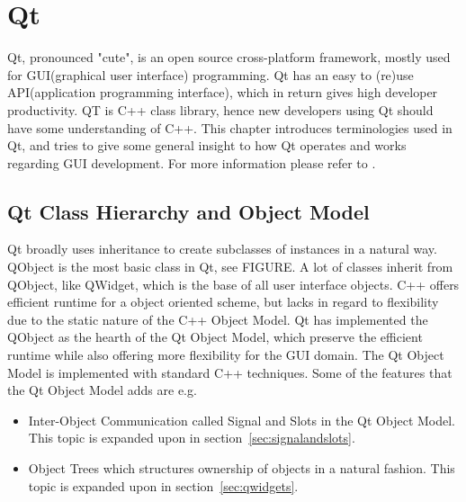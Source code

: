 \section{Qt}
Qt, pronounced "cute", is an open source cross-platform framework, mostly used for GUI(graphical user interface) programming. Qt has an easy to (re)use API(application programming interface), which in return gives high developer productivity. QT is C++ class library, hence new developers using Qt should have some understanding of C++.
This chapter introduces terminologies used in Qt, and tries to give some general insight to how Qt operates and works regarding GUI development. For more information please refer to \citep{Qt Documentation}.




\subsection{Qt Class Hierarchy and Object Model}
\label{sec:QtClassHierarchyAndObjectModel}
Qt broadly uses inheritance to create subclasses of instances in a natural way. QObject is the most basic class in Qt, see FIGURE. A lot of classes inherit from QObject, like QWidget, which is the base of all user interface objects. 
C++ offers efficient runtime for a object oriented scheme, but lacks in regard to flexibility due to the static nature of the C++ Object Model. Qt has implemented the QObject as the hearth of the Qt Object Model, which preserve the efficient runtime while also offering more flexibility for the GUI domain. The Qt Object Model is implemented with standard C++ techniques. Some of the features that the Qt Object Model adds are e.g.

\begin{itemize}
\item Inter-Object Communication called Signal and Slots in the Qt Object Model. This topic is expanded upon in section~\ref{sec:signalandslots}.
\item Object Trees which structures ownership of objects in a natural fashion. This topic is expanded upon in section~\ref{sec:qwidgets}.
\end{itemize}


